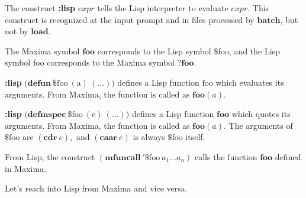 \documentclass[12pt,leqno]{article}
\begin{document}

The construct {\bf :lisp} $\mathit{expr}$ tells the Lisp interpreter
to evaluate $\mathit{expr}$.
This construct is recognized at the input prompt and in files processed by $\mathbf{batch}$,
but not by $\mathbf{load}$.

The Maxima symbol $\mathbf{foo}$ corresponds to the Lisp symbol \$foo,
and the Lisp symbol foo corresponds to the Maxima symbol $\mathbf{?foo}$.

{\bf :lisp} $\mathrm{(}\mathbf{defun\ } \mathrm{\$foo\ (a)\ (\ldots))}$
defines a Lisp function $\mathrm{foo}$ which evaluates its arguments.
From Maxima, the function is called as $\mathbf{foo}(a)$.

{\bf :lisp} $\mathrm{(}\mathbf{defmspec\ } \mathrm{\$foo\ (e)\ (\ldots))}$
defines a Lisp function $\mathbf{foo}$ which quotes its arguments.
From Maxima, the function is called as $\mathbf{foo}(a)$.
The arguments of $\mathrm{\$foo}$ are $(\mathbf{cdr\ } e),$
and $(\mathbf{caar\ } e)$ is always $\mathrm{\$foo}$ itself.

From Lisp, the construct $(\mathbf{mfuncall\ '\$}\mathrm{foo\ }a_1 \ldots a_n)$
calls the function $\mathbf{foo}$ defined in Maxima.

Let's reach into Lisp from Maxima and vice versa.
\end{document}
